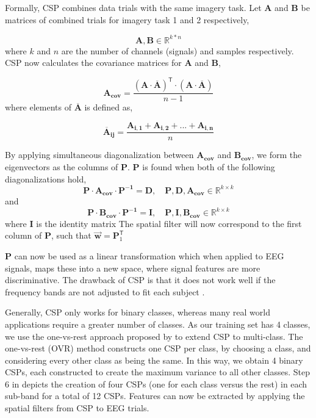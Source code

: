 Formally, CSP combines data trials with the same imagery task. Let $\pmb{A}$ and $\pmb{B}$ be matrices of combined trials for imagery task 1 and 2 respectively,

\begin{equation}
\label{eq:csp_data}
\pmb{A}, \mathbf{B} \in \mathbb{R}^{k*n}
\end{equation}
where $k$ and $n$ are the number of channels (signals) and samples respectively. CSP now calculates the covariance matrices for $\pmb{A}$ and $\pmb{B}$,

\begin{equation}
\label{eq:covariance_matrice}
\pmb{A_{cov}} = \frac{(\pmb{A} \cdot \overline{\pmb{A}})^\mathsf{T}  \cdot (\pmb{A} \cdot \overline{\pmb{A}})}{n - 1}
\end{equation}
where elements of $\overline{\pmb{A}}$ is defined as,

\begin{equation}
\label{eq:a_bar}
\pmb{\overline{A}_{ij}} = \frac{\pmb{A_{i,1}} + \pmb{A_{i,2}} + ... + \pmb{A_{i,n}}}{n}
\end{equation}

By applying simultaneous diagonalization between $\pmb{A_{cov}}$ and $\pmb{B_{cov}}$, we form the eigenvectors as the columns of $\pmb{P}$. $\pmb{P}$ is found when both of the following diagonalizations hold, 
\begin{equation}
\label{eq:diagonalization_A}
\pmb{P} \cdot \pmb{A_{cov}} \cdot \pmb{P^{-1}} = \pmb{D}, \quad \pmb{P}, \pmb{D}, \pmb{A_{cov}} \in \mathbb{R}^{k \times k}
\end{equation}
and
\begin{equation}
\label{eq:diagonalization_B}
\pmb{P} \cdot \pmb{B_{cov}} \cdot \pmb{P^{-1}} = \pmb{I}, \quad \pmb{P}, \pmb{I}, \pmb{B_{cov}} \in \mathbb{R}^{k \times k}
\end{equation}
where $\pmb{I}$ is the identity matrix
The spatial filter will now correspond to the first column of $\pmb{P}$, such that $\pmb{\vec{w}} = \pmb{P}^\mathsf{T}_{1}$ 

$\pmb{P}$ can now be used as a linear transformation which when applied to EEG signals, maps these into a new space, where signal features are more discriminative. The drawback of CSP is that it does not work well if the frequency bands are not adjusted to fit each subject \citep{novi2007sub}.

Generally, CSP only works for binary classes, whereas many real world applications require a greater number of classes. As our training set has 4 classes, we use the one-vs-rest approach proposed by \cite{ang2012filter} to extend CSP to multi-class. The one-vs-rest (OVR) method constructs one CSP per class, by choosing a class, and considering every other class as being the same. In this way, we obtain 4 binary CSPs, each constructed to create the maximum variance to all other classes. Step 6 in  depicts the creation of four CSPs (one for each class versus the rest) in each sub-band for a total of 12 CSPs. Features can now be extracted by applying the spatial filters from CSP to EEG trials.

